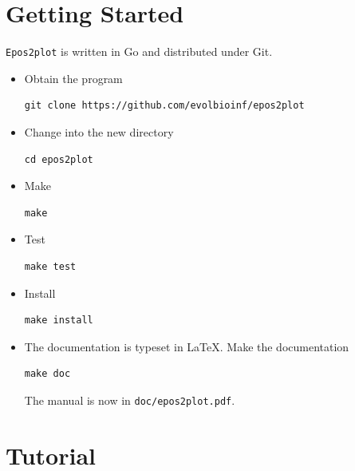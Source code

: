 \documentclass[a4paper]{article}
\newcommand{\ty}{\texttt}
\begin{document}
\section{Getting Started}
\ty{Epos2plot} is written in Go and distributed under Git.
\begin{itemize}
\item Obtain the program
\begin{verbatim}
git clone https://github.com/evolbioinf/epos2plot
\end{verbatim}
\item Change into the new directory
\begin{verbatim}
cd epos2plot
\end{verbatim}
\item Make
\begin{verbatim}
make
\end{verbatim}
\item Test
\begin{verbatim}
make test
\end{verbatim}
\item Install
\begin{verbatim}
make install
\end{verbatim}
\item The documentation is typeset in \LaTeX{}. Make the documentation
\begin{verbatim}
make doc
\end{verbatim}
The manual is now in \ty{doc/epos2plot.pdf}.
\end{itemize}

\section{Tutorial}
\end{document}
